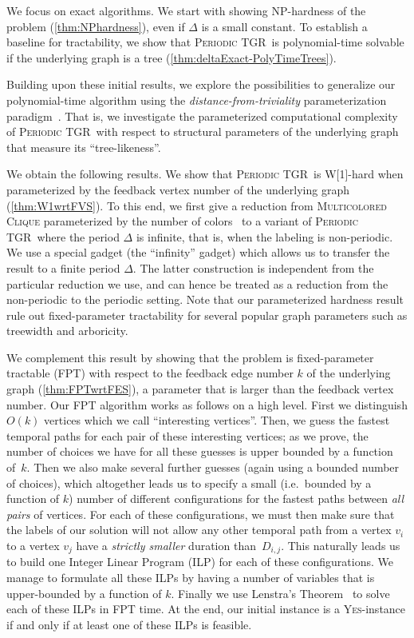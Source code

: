 \documentclass[a4paper,UKenglish,cleveref, autoref, thm-restate]{lipics-v2021}
\newcommand{\deltaExact}{\textsc{Periodic TGR}}
\begin{document}
We focus on exact algorithms. We start with showing NP-hardness of the problem (\cref{thm:NPhardness}), even if $\Delta$ is a small constant. To establish a baseline for tractability, we show that \deltaExact\ is polynomial-time solvable if the underlying graph is a tree (\cref{thm:deltaExact-PolyTimeTrees}).

Building upon these initial results, we explore the possibilities to generalize our polynomial-time algorithm using the \emph{distance-from-triviality} parameterization paradigm~\cite{FJR13,GHN04}. That is, we investigate the parameterized computational complexity of \deltaExact\ with respect to structural parameters of the underlying graph that measure its ``tree-likeness''.

We obtain the following results. We show that \deltaExact\ is W[1]-hard when parameterized by the feedback vertex number of the underlying graph (\cref{thm:W1wrtFVS}). 
To this end, we first give a reduction from \textsc{Multicolored Clique} parameterized by the number of colors~\cite{fellows2009multipleinterval} to a variant of \deltaExact\ where the period $\Delta$ is infinite, that is, when the labeling is non-periodic. We use a special gadget (the ``infinity'' gadget) which allows us to transfer the result to a finite period $\Delta$. The latter construction is independent from the particular reduction we use, and can hence be treated as a reduction from the non-periodic to the periodic setting.
Note that our parameterized hardness result rule out fixed-parameter tractability for several popular graph parameters such as treewidth and arboricity.

We complement this result by showing that the problem is fixed-parameter tractable (FPT) with respect to the feedback edge number $k$ of the underlying graph (\cref{thm:FPTwrtFES}), a parameter that is larger than the feedback vertex number. 
Our FPT algorithm works as follows on a high level. 
First we distinguish $O(k)$ vertices which we call ``interesting vertices''. 
Then, we guess the fastest temporal paths for each pair of these interesting vertices; as we prove, the number of choices we have for all these guesses is upper bounded by a function of~$k$. 
Then we also make several further guesses (again using a bounded number of choices), which altogether leads us to specify a small (i.e.~bounded by a function of $k$) number of different configurations for the fastest paths between \emph{all pairs} of vertices. For each of these configurations, we must then make sure that the labels of our solution will not allow any other temporal path from a vertex $v_i$ to a vertex $v_j$ have a \emph{strictly smaller} duration than~$D_{i,j}$.
This naturally leads us to build one Integer Linear Program (ILP) for each of these configurations. We manage to formulate all these ILPs by having a number of variables that is upper-bounded by a function of $k$. Finally we use Lenstra's Theorem~\cite{Lenstra1983Integer} to solve each of these ILPs in FPT time. At the end, our initial instance is a \textsc{Yes}-instance if and only if at least one of these ILPs is feasible.
\end{document}
